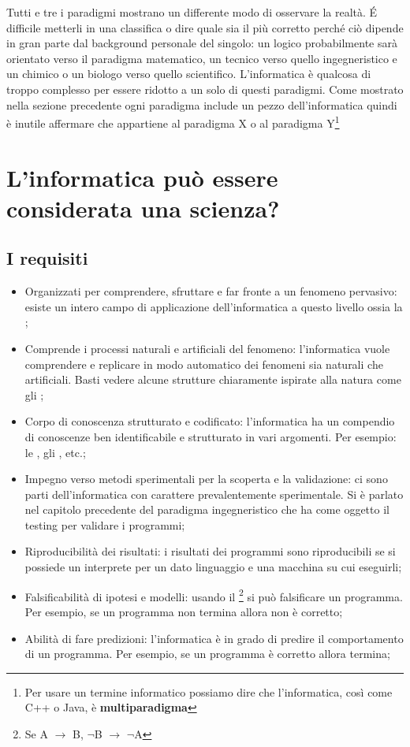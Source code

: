 Tutti e tre i paradigmi mostrano un differente modo di osservare la realtà. É difficile metterli in una classifica o dire quale sia il più corretto perché ciò dipende in gran parte dal background personale del singolo: un logico probabilmente sarà orientato verso il paradigma matematico, un tecnico verso quello ingegneristico e un chimico o un biologo verso quello scientifico. L'informatica è qualcosa di troppo complesso per essere ridotto a un solo di questi paradigmi. Come mostrato nella sezione precedente ogni paradigma include un pezzo dell'informatica quindi è inutile affermare che appartiene al paradigma X o al paradigma Y\footnote{Per usare un termine informatico possiamo dire che l'informatica, così come C++ o Java, è \textbf{multiparadigma}}

\section{L'informatica può essere considerata una scienza?}

\subsection{I requisiti}

\begin{itemize}
    \item Organizzati per comprendere, sfruttare e far fronte a un fenomeno pervasivo: esiste un intero campo di applicazione dell'informatica a questo livello ossia la ;
    \item Comprende i processi naturali e artificiali del fenomeno: l'informatica vuole comprendere e replicare in modo automatico dei fenomeni sia naturali che artificiali. Basti vedere alcune strutture chiaramente ispirate alla natura come gli ; 
    \item Corpo di conoscenza strutturato e codificato: l'informatica ha un compendio di conoscenze ben identificabile e strutturato in vari argomenti. Per esempio: le , gli , etc.;
    \item Impegno verso metodi sperimentali per la scoperta e la validazione: ci sono parti dell'informatica con carattere prevalentemente sperimentale. Si è parlato nel capitolo precedente del paradigma ingegneristico che ha come oggetto il testing per validare i programmi;
    \item Riproducibilità dei risultati: i risultati dei programmi sono riproducibili se si possiede un interprete per un dato linguaggio e una macchina su cui eseguirli;
    \item Falsificabilità di ipotesi e modelli: usando il \footnote{Se A $\rightarrow$ B, $\neg$B $\rightarrow$ $\neg$A} si può falsificare un programma. Per esempio, se un programma non termina allora non è corretto;
    \item Abilità di fare predizioni: l'informatica è in grado di predire il comportamento di un programma. Per esempio, se un programma è corretto allora termina;
\end{itemize}

